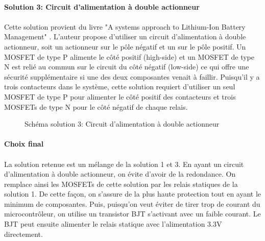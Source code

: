 		\paragraph*{Solution 3: Circuit d'alimentation à double actionneur}
		\paragraph*{}
		Cette solution provient du livre "A systems approach to Lithium-Ion Battery Management" \cite{System_Approach}. L'auteur propose d'utiliser un circuit d'alimentation à double actionneur, soit un actionneur sur le pôle négatif et un sur le pôle positif. Un MOSFET de type P alimente le côté positif (high-side) et un MOSFET de type N est relié au commun sur le circuit du côté négatif (low-side) ce qui offre une sécurité supplémentaire si une des deux composantes venait à faillir. Puisqu'il y a trois contacteurs dans le système, cette solution requiert d'utiliser un seul MOSFET de type P pour alimenter le côté positif des contacteurs et trois MOSFETs de type N pour le côté négatif de chaque relais.

		\begin{figure}[H]
			\centering
			\caption{Schéma solution 3: Circuit d'alimentation à double actionneur}
			\label{fig:contactorsol3}
		\end{figure}

		\paragraph*{Choix final}
		\paragraph*{}
		La solution retenue est un mélange de la solution 1 et 3. En ayant un circuit d'alimentation à double actionneur, on évite d'avoir de la redondance. On remplace ainsi les MOSFETs de cette solution par les relais statiques de la solution 1. De cette façon, on s'assure de la plus haute protection tout en ayant le minimum de composantes. Puis, puisqu'on veut éviter de tirer trop de courant du microcontrôleur, on utilise un transistor BJT s'activant avec un faible courant. Le BJT peut ensuite alimenter le relais statique avec l'alimentation 3.3V directement.

